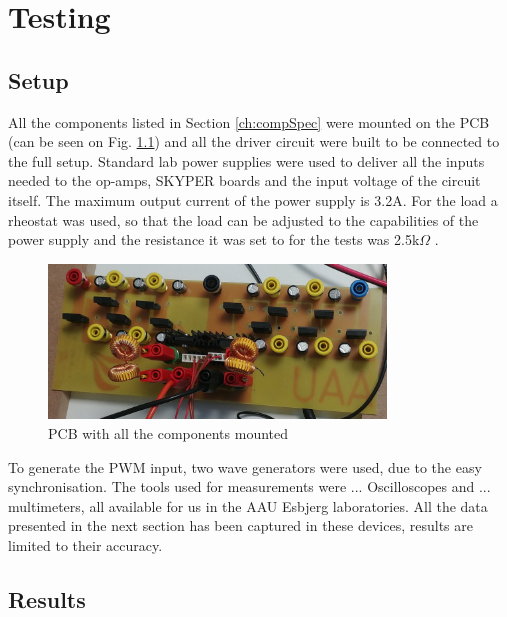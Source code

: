 \chapter{Testing}\label{ch:testing}

\section{Setup}
All the components listed in Section \ref{ch:compSpec} were mounted on the PCB (can be seen on Fig. \ref{fig:SETUP}) and all the driver circuit were built to be connected to the full setup.
Standard lab power supplies were used to deliver all the inputs needed to the op-amps, SKYPER boards and the input voltage of the circuit itself. 
The maximum output current of the power supply is 3.2A.
For the load a rheostat was used, so that the load can be adjusted to the capabilities of the power supply and the resistance it was set to for the tests was 2.5k$\Omega$ . 

\begin{figure}[H]
	\begin{center}
   \includegraphics[width=0.8\textwidth]{figures/06Testing/setup.jpg}
	\end{center}
	\vspace{-4mm}
	\caption{PCB with all the components mounted}
	\label{fig:SETUP}
\end{figure}

To generate the PWM input, two wave generators were used, due to the easy synchronisation. The tools used for measurements were ... Oscilloscopes and ... multimeters, all available for us in the AAU Esbjerg laboratories.
All the data presented in the next section has been captured in these devices, results are limited to their accuracy.
\clearpage
\vspace{-6mm}
\section{Results}

